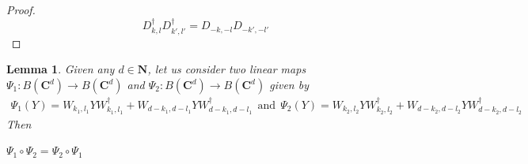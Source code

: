 \documentclass[12pt]{amsart}
\numberwithin{equation}{section}
\newtheorem{lemma}{Lemma}[section]
\begin{document}
\begin{proof}
\begin{equation}
\end{equation}
\begin{equation}\label{rel8}
    D_{k,l}^{\dagger}D_{k',l'}^{\dagger}=D_{-k,-l}D_{-k',-l'}
\end{equation}
\fi

    
    
    
    
    
    

\end{proof}

\iffalse
\begin{lemma}
    Given any $d\in \mathbf{N}$,  let us consider two linear maps $\Psi_1: B\left(\mathbf{C}^d\right) \rightarrow B\left(\mathbf{C}^d\right) $ and $\Psi_2:B\left(\mathbf{C}^d\right) \rightarrow B\left(\mathbf{C}^d\right)$ given by
    \begin{eqnarray*}
        \Psi_1 (Y)=W_{k_1,l_1} Y W^{\dagger}_{k_1,l_1} + W_{d-k_1,d-l_1} Y W^{\dagger}_{d-k_1,d-l_1} ~~\text{and}~~\Psi_2 (Y)=W_{k_2,l_2} Y W^{\dagger}_{k_2,l_2} + W_{d-k_2,d-l_2} Y W^{\dagger}_{d-k_2,d-l_2}
    \end{eqnarray*}
    Then
    \begin{center}
        $\Psi_1 \circ \Psi_2 = \Psi_2 \circ \Psi_1$
    \end{center}
\end{lemma}
\vspace{0.4cm}
\end{document}
